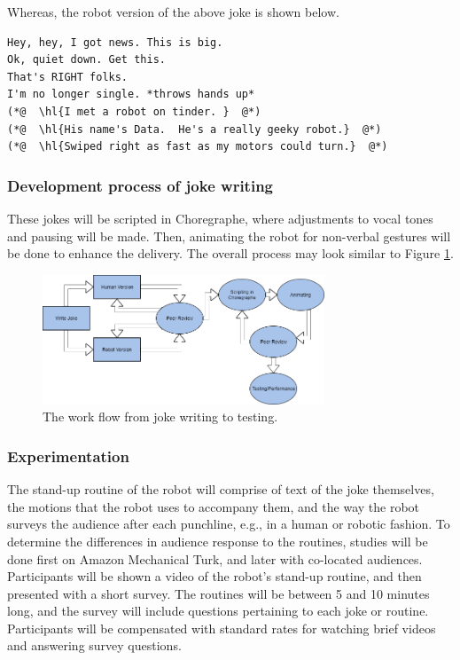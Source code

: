 \documentclass[onecolumn, draftclsnofoot,10pt, compsoc]{IEEEtran}
\begin{document}
Whereas, the robot version of the above joke is shown below.

\begin{lstlisting}
Hey, hey, I got news. This is big.
Ok, quiet down. Get this.
That's RIGHT folks.
I'm no longer single. *throws hands up*
(*@  \hl{I met a robot on tinder. }  @*)
(*@  \hl{His name's Data.  He's a really geeky robot.}  @*)
(*@  \hl{Swiped right as fast as my motors could turn.}  @*)
\end{lstlisting}

\subsubsection{Development process of joke writing}
These jokes will be scripted in Choregraphe, where adjustments to vocal tones and pausing will be made.
Then, animating the robot for non-verbal gestures will be done to enhance the delivery.
The overall process may look similar to Figure \ref{fig:write_process}.

\begin{figure}[H]
  \centering
  \includegraphics[width=0.75\textwidth,height=0.75\textheight,keepaspectratio]{joke_writing_process}
  \caption{The work flow from joke writing to testing.}
	\label{fig:write_process}
\end{figure}

\subsubsection{Experimentation}
The stand-up routine of the robot will comprise of text of the joke themselves, the motions that the robot uses to
accompany them, and the way the robot surveys the audience after each punchline, e.g., in a human or robotic fashion.
To determine the differences in audience response to the routines, studies will be done first on Amazon Mechanical
Turk, and later with co-located audiences. Participants will be shown a video of the robot’s stand-up routine, and then
presented with a short survey. The routines will be between 5 and 10 minutes long, and the survey will include questions
pertaining to each joke or routine. Participants will be compensated with standard rates for watching brief videos and
answering survey questions.
\end{document}
